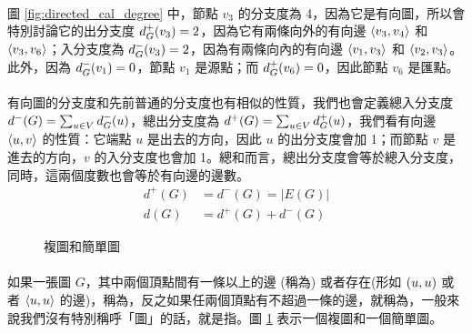 \documentclass[12pt,a4paper,oneside]{report}
\begin{document}
\begin{CJK}{UTF8}{bkai}
\paragraph{}圖 \ref{fig:directed_cal_degree} 中，節點 $v_3$ 的分支度為 4，因為它是有向圖，所以會特別討論它的出分支度 $d^{+}_{G}{(v_3)}=2$，因為它有兩條向外的有向邊 $\langle{}{{v_3},{v_4}}\rangle{}$ 和 $\langle{}{{v_3},{v_6}}\rangle{}$；入分支度為 $d^{-}_{G}{(v_3)}=2$，因為有兩條向內的有向邊 $\langle{}{{v_1},{v_3}}\rangle{}$ 和 $\langle{}{{v_2},{v_3}}\rangle{}$。此外，因為 $d^{-}_{G}{(v_1)}=0$，節點 $v_1$ 是源點；而 $d^{+}_{G}{(v_6)}=0$，因此節點 $v_6$ 是匯點。
\paragraph{}有向圖的分支度和先前普通的分支度也有相似的性質，我們也會定義總入分支度 $d^{-}{(G)}=\sum_{u\in{V}}{d^{-}_{G}{(u)}}$，總出分支度為 $d^{+}{(G)}=\sum_{u\in{V}}{d^{+}_{G}{(u)}}$，我們看有向邊 $\langle{}{{u},{v}}\rangle{}$ 的性質：它端點 $u$ 是出去的方向，因此 $u$ 的出分支度會加 1；而節點 $v$ 是進去的方向，$v$ 的入分支度也會加 1。總和而言，總出分支度會等於總入分支度，同時，這兩個度數也會等於有向邊的邊數。
\begin{align}
\label{eq:degree_directed}
d^{+}{(G)}&=d^{-}{(G)}=|E(G)|\\
d(G)&=d^{+}{(G)}+d^{-}{(G)}
\end{align}
\begin{figure}[h!]
\centering
{}
\caption{複圖和簡單圖}
\label{fig:multigraph_and_simple}
\end{figure}
\paragraph{}如果一張圖 $G$，其中兩個頂點間有一條以上的邊 (稱為) 或者存在\textbf{}(形如 $({u},{u})$ 或者 $\langle{}{{u},{u}}\rangle{}$ 的邊)，稱為，反之如果任兩個頂點有不超過一條的邊，就稱為\textbf{}，一般來說我們沒有特別稱呼「圖」的話，就是指。圖 \ref{fig:multigraph_and_simple} 表示一個複圖和一個簡單圖。


\end{CJK}
\end{document}
